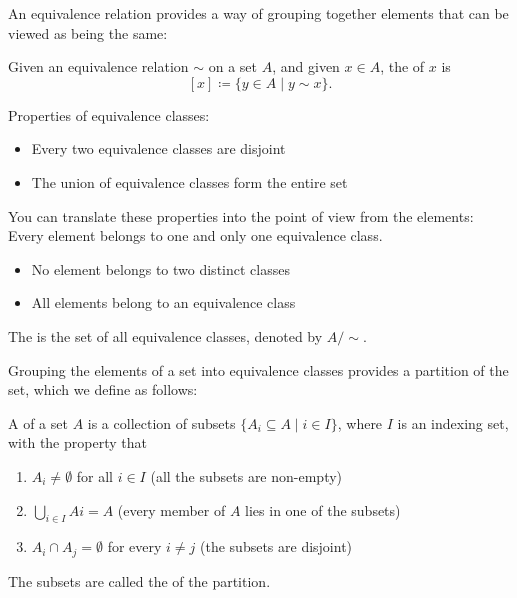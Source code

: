 An equivalence relation provides a way of grouping together elements that can be viewed as being the same:

\begin{definition}
Given an equivalence relation $\sim$ on a set $A$, and given $x \in A$, the  of $x$ is
\[[x]\coloneqq\{y\in A\mid y\sim x\}.\]
\end{definition}

Properties of equivalence classes:
\begin{itemize}
\item Every two equivalence classes are disjoint
\item The union of equivalence classes form the entire set
\end{itemize}

You can translate these properties into the point of view from the elements: Every element belongs to one and only one equivalence class.
\begin{itemize}
\item No element belongs to two distinct classes
\item All elements belong to an equivalence class
\end{itemize}

\begin{definition}
The  is the set of all equivalence classes, denoted by $A/\sim$.
\end{definition}

Grouping the elements of a set into equivalence classes provides a partition of the set, which we define as follows:

\begin{definition}[Partition]
A  of a set $A$ is a collection of subsets $\{A_i\subseteq A\mid i\in I\}$, where $I$ is an indexing set, with the property that
\begin{enumerate}[label=(\roman*)]
\item $A_i \neq \emptyset$ for all $i \in I$ (all the subsets are non-empty)
\item $\bigcup_{i\in I} Ai = A$ (every member of $A$ lies in one of the subsets)
\item $A_i \cap A_j = \emptyset$ for every $i \neq j$ (the subsets are disjoint)
\end{enumerate}
The subsets are called the  of the partition.
\end{definition}

